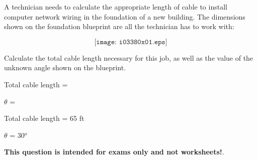 

A technician needs to calculate the appropriate length of cable to install computer network wiring in the foundation of a new building.  The dimensions shown on the foundation blueprint are all the technician has to work with:

$$\texttt{[image: i03380x01.eps]}$$

Calculate the total cable length necessary for this job, as well as the value of the unknown angle shown on the blueprint.

\vskip 20pt

Total cable length = 

\vskip 10pt

$\theta$ = 







Total cable length = 65 ft

\vskip 10pt

$\theta$ = 30$^{o}$







{\bf This question is intended for exams only and not worksheets!}.



